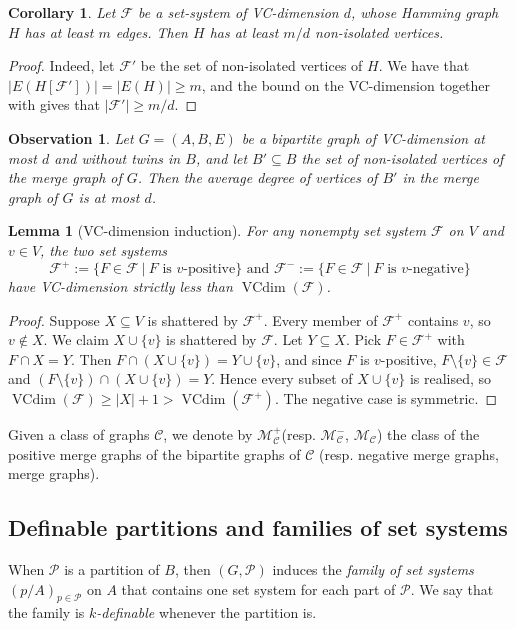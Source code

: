 \documentclass[11pt]{article}
\newtheorem{corollary}[theorem]{Corollary}
\newtheorem{lemma}[theorem]{Lemma}
\newtheorem{observation}[theorem]{Observation}
\theoremstyle{definition}
\newcommand{\CC}{{\mathscr C}}
\renewcommand{\ge}{\geqslant}
\newcommand{\set}[1]{\{#1\}}
\renewcommand{\cal}{\mathcal}
\DeclareMathOperator{\VCdim}{VCdim}
\newcommand{\Pp}{\mathcal{P}}
\newcommand{\remph}[1]{{\color{red} \emph{#1}}}
\begin{document}
\begin{corollary}\label{cor:hamming}
Let $\cal F$ be a set-system of VC-dimension $d$, whose Hamming graph $H$ has at least $m$ edges. Then $H$ has at least $m/d$ non-isolated vertices.
\end{corollary}
\begin{proof}
Indeed, let $\cal F'$ be the set of non-isolated vertices of $H$. We have that $|E(H[\cal F'])| = |E(H)| \ge m$, and the bound on the VC-dimension together with  gives that $|\cal F'| \ge m / d$.
\end{proof}

\begin{observation}\label{obs:merge-graph-density}
Let $G = (A, B, E)$ be a bipartite graph of VC-dimension at most $d$ and without twins in $B$, and let $B' \subseteq B$ the set of non-isolated vertices of the merge graph of $G$.
Then the average degree of vertices of $B'$ in the merge graph of $G$ is at most $d$.
\end{observation}

\begin{lemma}[VC-dimension induction]\label{lem:VC-induction-dabe}
For any nonempty set system $\cal F$ on $V$ and $v\in V$, the two set systems
\[
\cal F^+ := \{F \in \cal F ~|~F \text{ is $v$-positive}\} \text{ and } \cal F^- := \{F \in \cal F ~|~F \text{ is $v$-negative}\}
\]
have VC-dimension strictly less than $\VCdim(\cal F)$.
\end{lemma}
\begin{proof}
Suppose $X \subseteq V$ is shattered by $\cal F^+$. Every member of $\cal F^+$
contains $v$, so $v \notin X$. We claim $X \cup \{v\}$ is shattered by $\cal F$.
Let $Y \subseteq X$. Pick $F \in \cal F^+$ with $F \cap X = Y$. Then
$F \cap (X \cup \set{v}) = Y \cup \set{v}$, and since $F$ is $v$-positive,
$F \setminus \set{v} \in \cal F$ and
$(F \setminus \set v) \cap (X \cup \set v) = Y$. Hence every subset of
$X \cup \set v$ is realised, so
$\VCdim(\cal F) \ge |X| + 1 > \VCdim(\cal F^+)$. The negative case is symmetric.
\end{proof}

Given a class of graphs $\CC$, we denote by \remph{$\cal M^+_{\CC}$}(resp. \remph{$\cal M^-_{\CC}$}, \remph{$\cal M_{\CC}$}) the class of the positive merge graphs of the bipartite graphs of $\CC$ (resp. negative merge graphs, merge graphs).

\subsection{Definable partitions and families of set systems}
When $\Pp$ is a partition of $B$, then $(G, \Pp)$ induces the \remph{family of set systems} $(p/A)_{p \in \Pp}$ on $A$ that contains one set system for each part of $\Pp$. We say that the family is \remph{$k$-definable} whenever the partition is.
\end{document}
